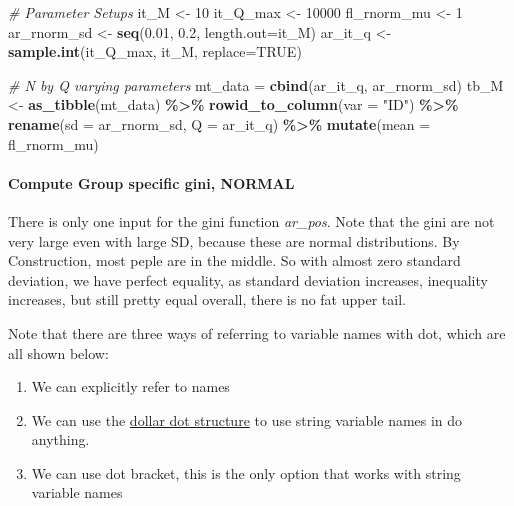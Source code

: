\documentclass[
]{book}
\newenvironment{Shaded}{\begin{snugshade}}{\end{snugshade}}
\newcommand{\CommentTok}[1]{\textcolor[rgb]{0.56,0.35,0.01}{\textit{#1}}}
\newcommand{\DataTypeTok}[1]{\textcolor[rgb]{0.13,0.29,0.53}{#1}}
\newcommand{\DecValTok}[1]{\textcolor[rgb]{0.00,0.00,0.81}{#1}}
\newcommand{\FloatTok}[1]{\textcolor[rgb]{0.00,0.00,0.81}{#1}}
\newcommand{\KeywordTok}[1]{\textcolor[rgb]{0.13,0.29,0.53}{\textbf{#1}}}
\newcommand{\NormalTok}[1]{#1}
\newcommand{\OperatorTok}[1]{\textcolor[rgb]{0.81,0.36,0.00}{\textbf{#1}}}
\newcommand{\OtherTok}[1]{\textcolor[rgb]{0.56,0.35,0.01}{#1}}
\newcommand{\StringTok}[1]{\textcolor[rgb]{0.31,0.60,0.02}{#1}}
\providecommand{\tightlist}{%
  \setlength{\itemsep}{0pt}\setlength{\parskip}{0pt}}
\begin{document}
\begin{Shaded}
\begin{Highlighting}[]
\CommentTok{\# Parameter Setups}
\NormalTok{it\_M \textless{}{-}}\StringTok{ }\DecValTok{10}
\NormalTok{it\_Q\_max \textless{}{-}}\StringTok{ }\DecValTok{10000}
\NormalTok{fl\_rnorm\_mu \textless{}{-}}\StringTok{ }\DecValTok{1}
\NormalTok{ar\_rnorm\_sd \textless{}{-}}\StringTok{ }\KeywordTok{seq}\NormalTok{(}\FloatTok{0.01}\NormalTok{, }\FloatTok{0.2}\NormalTok{, }\DataTypeTok{length.out=}\NormalTok{it\_M)}
\NormalTok{ar\_it\_q \textless{}{-}}\StringTok{ }\KeywordTok{sample.int}\NormalTok{(it\_Q\_max, it\_M, }\DataTypeTok{replace=}\OtherTok{TRUE}\NormalTok{)}

\CommentTok{\# N by Q varying parameters}
\NormalTok{mt\_data =}\StringTok{ }\KeywordTok{cbind}\NormalTok{(ar\_it\_q, ar\_rnorm\_sd)}
\NormalTok{tb\_M \textless{}{-}}\StringTok{ }\KeywordTok{as\_tibble}\NormalTok{(mt\_data) }\OperatorTok{\%\textgreater{}\%}\StringTok{ }\KeywordTok{rowid\_to\_column}\NormalTok{(}\DataTypeTok{var =} \StringTok{"ID"}\NormalTok{) }\OperatorTok{\%\textgreater{}\%}
\StringTok{                }\KeywordTok{rename}\NormalTok{(}\DataTypeTok{sd =}\NormalTok{ ar\_rnorm\_sd, }\DataTypeTok{Q =}\NormalTok{ ar\_it\_q) }\OperatorTok{\%\textgreater{}\%}
\StringTok{                }\KeywordTok{mutate}\NormalTok{(}\DataTypeTok{mean =}\NormalTok{ fl\_rnorm\_mu)}
\end{Highlighting}
\end{Shaded}

\hypertarget{compute-group-specific-gini-normal}{%
\paragraph{Compute Group specific gini, NORMAL}\label{compute-group-specific-gini-normal}}

There is only one input for the gini function \emph{ar\_pos}. Note that the gini are not very large even with large SD, because these are normal distributions. By Construction, most peple are in the middle. So with almost zero standard deviation, we have perfect equality, as standard deviation increases, inequality increases, but still pretty equal overall, there is no fat upper tail.

Note that there are three ways of referring to variable names with dot, which are all shown below:

\begin{enumerate}
\def\labelenumi{\arabic{enumi}.}
\tightlist
\item
  We can explicitly refer to names
\item
  We can use the \href{https://stackoverflow.com/a/18228613/8280804}{dollar dot structure} to use string variable names in do anything.
\item
  We can use dot bracket, this is the only option that works with string variable names
\end{enumerate}
\end{document}
